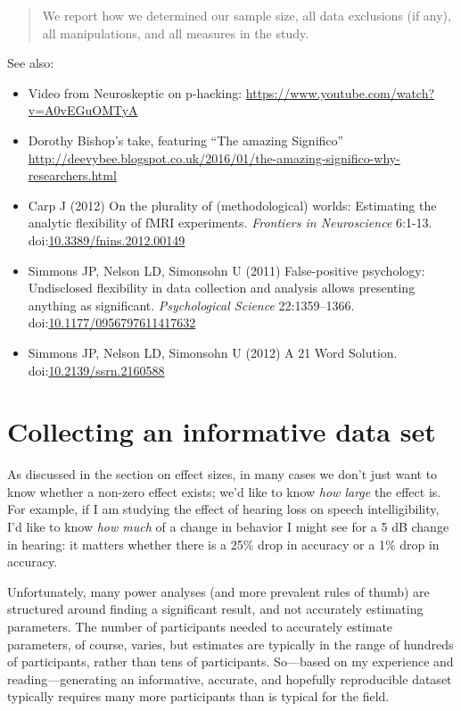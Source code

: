 \documentclass[letterpaper,oneside,11pt,article, portrait]{memoir}
\newcommand{\doi}[1]{doi:\href{http://dx.doi.org/#1}{#1}}
\newcommand{\journal}[1]{\textit{#1}} 			%
\begin{document}
\begin{quote}
We report how we determined our sample size, all data exclusions (if any), all manipulations, and all measures in the study.
\end{quote}

\vspace{1em} \noindent See also:

\begin{itemize}
\item Video from Neuroskeptic on p-hacking: \url{https://www.youtube.com/watch?v=A0vEGuOMTyA} 
\item Dorothy Bishop's take, featuring ``The amazing Significo'' \url{http://deevybee.blogspot.co.uk/2016/01/the-amazing-significo-why-researchers.html}
\item Carp J (2012) On the plurality of (methodological) worlds: Estimating the analytic flexibility of fMRI experiments. \journal{Frontiers in Neuroscience} 6:1-13. \doi{10.3389/fnins.2012.00149}
\item Simmons JP, Nelson LD, Simonsohn U (2011) False-positive psychology: Undisclosed flexibility in data collection and analysis allows presenting anything as significant. \journal{Psychological Science} 22:1359--1366. \doi{10.1177/0956797611417632}
\item Simmons JP,  Nelson LD, Simonsohn U (2012) A 21 Word Solution. \doi{10.2139/ssrn.2160588}
\end{itemize}


\chapter{Collecting an informative data set} \label{n}

As discussed in the section on effect sizes, in many cases we don't just want to know whether a non-zero effect exists; we'd like to know \textit{how large} the effect is. For example, if I am studying the effect of hearing loss on speech intelligibility, I'd like to know \textit{how much} of a change in behavior I might see for a 5 dB change in hearing: it matters whether there is a 25\% drop in accuracy or a 1\% drop in accuracy.

Unfortunately, many power analyses (and more prevalent rules of thumb) are structured around finding a significant result, and not accurately estimating parameters. The number of participants needed to accurately estimate parameters, of course, varies, but estimates are typically in the range of hundreds of participants, rather than tens of participants. So---based on my experience and reading---generating an informative, accurate, and hopefully reproducible dataset typically requires many more participants than is typical for the field.
\end{document}

